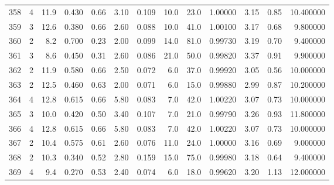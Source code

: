 \begin{tabular}{lrrrrrrrrrrrr}
358  &        4 &           11.9 &             0.430 &         0.66 &            3.10 &      0.109 &                 10.0 &                  23.0 &  1.00000 &  3.15 &       0.85 &  10.400000 \\
359  &        3 &           12.6 &             0.380 &         0.66 &            2.60 &      0.088 &                 10.0 &                  41.0 &  1.00100 &  3.17 &       0.68 &   9.800000 \\
360  &        2 &            8.2 &             0.700 &         0.23 &            2.00 &      0.099 &                 14.0 &                  81.0 &  0.99730 &  3.19 &       0.70 &   9.400000 \\
361  &        3 &            8.6 &             0.450 &         0.31 &            2.60 &      0.086 &                 21.0 &                  50.0 &  0.99820 &  3.37 &       0.91 &   9.900000 \\
362  &        2 &           11.9 &             0.580 &         0.66 &            2.50 &      0.072 &                  6.0 &                  37.0 &  0.99920 &  3.05 &       0.56 &  10.000000 \\
363  &        2 &           12.5 &             0.460 &         0.63 &            2.00 &      0.071 &                  6.0 &                  15.0 &  0.99880 &  2.99 &       0.87 &  10.200000 \\
364  &        4 &           12.8 &             0.615 &         0.66 &            5.80 &      0.083 &                  7.0 &                  42.0 &  1.00220 &  3.07 &       0.73 &  10.000000 \\
365  &        3 &           10.0 &             0.420 &         0.50 &            3.40 &      0.107 &                  7.0 &                  21.0 &  0.99790 &  3.26 &       0.93 &  11.800000 \\
366  &        4 &           12.8 &             0.615 &         0.66 &            5.80 &      0.083 &                  7.0 &                  42.0 &  1.00220 &  3.07 &       0.73 &  10.000000 \\
367  &        2 &           10.4 &             0.575 &         0.61 &            2.60 &      0.076 &                 11.0 &                  24.0 &  1.00000 &  3.16 &       0.69 &   9.000000 \\
368  &        2 &           10.3 &             0.340 &         0.52 &            2.80 &      0.159 &                 15.0 &                  75.0 &  0.99980 &  3.18 &       0.64 &   9.400000 \\
369  &        4 &            9.4 &             0.270 &         0.53 &            2.40 &      0.074 &                  6.0 &                  18.0 &  0.99620 &  3.20 &       1.13 &  12.000000 \\

\end{tabular}
